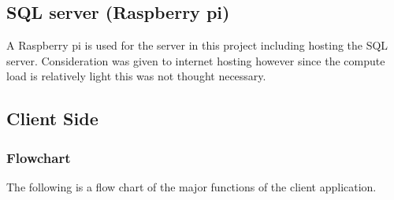\documentclass[fleqn]{article}
\begin{document}
\subsection{SQL server (Raspberry pi)}
A Raspberry pi is used for the server in this project including hosting the SQL server. Consideration was given to internet hosting however since the compute load is relatively light this was not thought necessary.

\newpage
\subsection{Client Side}
\subsubsection{Flowchart}
The following is a flow chart of the major functions of the client application. 
\end{document}
